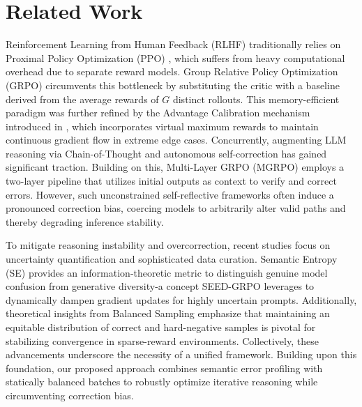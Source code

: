\section{Related Work}

Reinforcement Learning from Human Feedback (RLHF) \cite{10.5555/3294996.3295184}\cite{Ji2024ReinforcementLF} traditionally relies on Proximal Policy Optimization (PPO) \cite{schulman2017proximalpolicyoptimizationalgorithms}, which suffers from heavy computational overhead due to separate reward models. Group Relative Policy Optimization (GRPO) \cite{shao2024deepseekmathpushinglimitsmathematical} circumvents this bottleneck by substituting the critic with a baseline derived from the average rewards of $G$ distinct rollouts. This memory-efficient paradigm was further refined by the Advantage Calibration mechanism introduced in \cite{nan2025ngrponegativeenhancedgrouprelative}, which incorporates virtual maximum rewards to maintain continuous gradient flow in extreme edge cases. Concurrently, augmenting LLM reasoning via Chain-of-Thought \cite{10.5555/3600270.3602070} and autonomous self-correction \cite{madaan2023selfrefineiterativerefinementselffeedback} has gained significant traction. Building on this, Multi-Layer GRPO (MGRPO) \cite{ding2025multilayergrpoenhancingreasoning} employs a two-layer pipeline that utilizes initial outputs as context to verify and correct errors. However, such unconstrained self-reflective frameworks often induce a pronounced correction bias, coercing models to arbitrarily alter valid paths and thereby degrading inference stability.

To mitigate reasoning instability and overcorrection, recent studies focus on uncertainty quantification and sophisticated data curation. Semantic Entropy (SE) \cite{kuhn2023semanticuncertaintylinguisticinvariances} provides an information-theoretic metric to distinguish genuine model confusion from generative diversity-a concept SEED-GRPO \cite{chen2025seedgrposemanticentropyenhanced} leverages to dynamically dampen gradient updates for highly uncertain prompts. Additionally, theoretical insights from Balanced Sampling \cite{gao2026divagrpoenhancingmultimodalreasoning} emphasize that maintaining an equitable distribution of correct and hard-negative samples is pivotal for stabilizing convergence in sparse-reward environments. Collectively, these advancements underscore the necessity of a unified framework. Building upon this foundation, our proposed approach combines semantic error profiling with statically balanced batches to robustly optimize iterative reasoning while circumventing correction bias.
